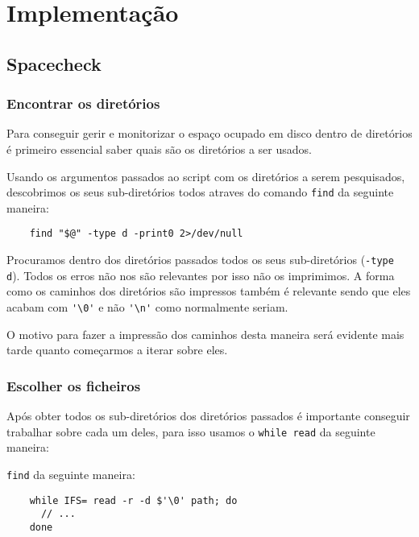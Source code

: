 \chapter{Implementação}

\section{Spacecheck}

\subsection{Encontrar os diretórios}

Para conseguir gerir e monitorizar o espaço ocupado em disco dentro de
diretórios é primeiro essencial saber quais são os diretórios a ser usados.

Usando os argumentos passados ao script com os diretórios a serem pesquisados,
descobrimos os seus sub-diretórios todos atraves do comando
\texttt{find} da seguinte maneira:
\begin{listing}[H]
  \begin{verbatim}
    find "$@" -type d -print0 2>/dev/null
  \end{verbatim}
\end{listing}
Procuramos dentro dos diretórios passados todos os seus sub-diretórios
(\texttt{-type d}). Todos os erros não nos são relevantes por isso
não os imprimimos. A forma como os caminhos dos diretórios são impressos também
é relevante sendo que eles acabam com \Verb|'\0'| e não \Verb|'\n'| como normalmente
seriam.

O motivo para fazer a impressão dos caminhos desta maneira será evidente mais
tarde quanto começarmos a iterar sobre eles.

\subsection{Escolher os ficheiros}

Após obter todos os sub-diretórios dos diretórios passados é importante
conseguir trabalhar sobre cada um deles, para isso usamos o
\texttt{while read} da seguinte maneira:

\texttt{find} da seguinte maneira:
\begin{listing}[H]
  \begin{verbatim}
    while IFS= read -r -d $'\0' path; do
      // ...
    done
  \end{verbatim}
\end{listing}

